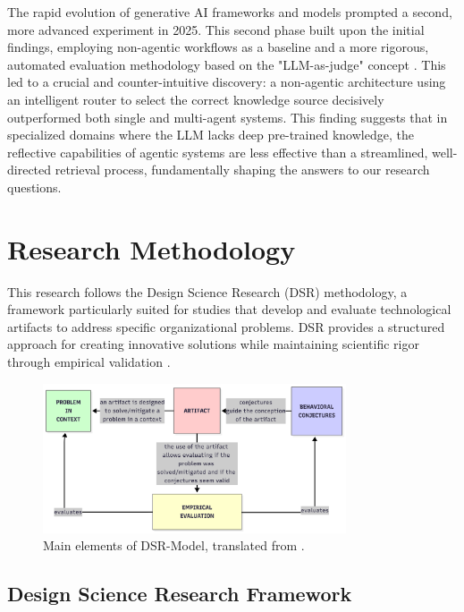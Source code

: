     The rapid evolution of generative AI frameworks and models prompted a second, more advanced experiment in 2025. This second phase built upon the initial findings, employing non-agentic workflows as a baseline and a more rigorous, automated evaluation methodology based on the "LLM-as-judge" concept \citep{Gu2025}. This led to a crucial and counter-intuitive discovery: a non-agentic architecture using an intelligent router to select the correct knowledge source decisively outperformed both single and multi-agent systems. This finding suggests that in specialized domains where the LLM lacks deep pre-trained knowledge, the reflective capabilities of agentic systems are less effective than a streamlined, well-directed retrieval process, fundamentally shaping the answers to our research questions.



\section{Research Methodology}
  
    This research follows the Design Science Research (DSR) methodology, a framework particularly suited for studies that develop and evaluate technological artifacts to address specific organizational problems. DSR provides a structured approach for creating innovative solutions while maintaining scientific rigor through empirical validation \citep{hevner2007three}.
    
    \begin{figure}[h]
    \centering
    \includegraphics[width=0.8\textwidth]{images/dsr-model.png}
    \caption{Main elements of DSR-Model, translated from \citet{Oswald2023}.}
    \label{fig:dsr-model}
    \end{figure}
    
    \subsection{Design Science Research Framework}
    
